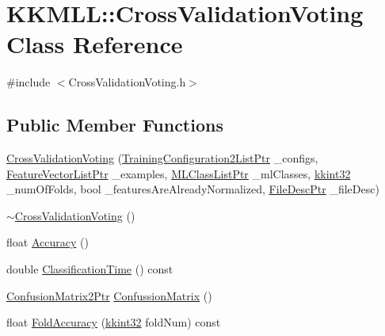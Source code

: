 \hypertarget{class_k_k_m_l_l_1_1_cross_validation_voting}{}\section{K\+K\+M\+LL\+:\+:Cross\+Validation\+Voting Class Reference}
\label{class_k_k_m_l_l_1_1_cross_validation_voting}


{\ttfamily \#include $<$Cross\+Validation\+Voting.\+h$>$}

\subsection*{Public Member Functions}
\begin{DoxyCompactItemize}
\item 
\hyperlink{class_k_k_m_l_l_1_1_cross_validation_voting_a4c9f4754ddea1b67ea5668f6295984bf}{Cross\+Validation\+Voting} (\hyperlink{namespace_k_k_m_l_l_a77bfbdd70b510fed053cec865434ba28}{Training\+Configuration2\+List\+Ptr} \+\_\+configs, \hyperlink{namespace_k_k_m_l_l_acf2ba92a3cf03e2b19674b24ff488ef6}{Feature\+Vector\+List\+Ptr} \+\_\+examples, \hyperlink{namespace_k_k_m_l_l_af091cde3f4a4315658b41a5e7583fc26}{M\+L\+Class\+List\+Ptr} \+\_\+ml\+Classes, \hyperlink{namespace_k_k_b_a8fa4952cc84fda1de4bec1fbdd8d5b1b}{kkint32} \+\_\+num\+Of\+Folds, bool \+\_\+features\+Are\+Already\+Normalized, \hyperlink{namespace_k_k_m_l_l_aa0d0b6ab4ec18868a399b8455b05d914}{File\+Desc\+Ptr} \+\_\+file\+Desc)
\item 
\hyperlink{class_k_k_m_l_l_1_1_cross_validation_voting_a9bfe73a47df2c53023da0a982a84b44c}{$\sim$\+Cross\+Validation\+Voting} ()
\item 
float \hyperlink{class_k_k_m_l_l_1_1_cross_validation_voting_a8c566b5bd2a82641816ac30ad03b5189}{Accuracy} ()
\item 
double \hyperlink{class_k_k_m_l_l_1_1_cross_validation_voting_a6152eb03e232e616edd1516b37f86901}{Classification\+Time} () const 
\item 
\hyperlink{namespace_k_k_m_l_l_a724c9a3c5315800e128adf68253e91ae}{Confusion\+Matrix2\+Ptr} \hyperlink{class_k_k_m_l_l_1_1_cross_validation_voting_a79dfd272802dcb1477223436e1963047}{Confussion\+Matrix} ()
\item 
float \hyperlink{class_k_k_m_l_l_1_1_cross_validation_voting_ae3ed157e7d9d1df5d03bfdb83c78658a}{Fold\+Accuracy} (\hyperlink{namespace_k_k_b_a8fa4952cc84fda1de4bec1fbdd8d5b1b}{kkint32} fold\+Num) const 
\item 

\end{DoxyCompactItemize}

